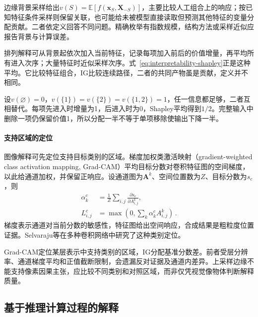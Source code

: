 边缘背景采样给出$v(S)=\mathbb E[f(\bm x_S,\bm X_{-S})]$，主要比较人工组合上的响应；按已知特征条件采样则保留关联，也可能给未被模型直接读取但预测其他特征的变量分配贡献。二者依定义回答不同问题。精确枚举有指数规模，结构方法或采样近似应报告背景与计算误差。

排列解释可从背景起依次加入当前特征，记录每项加入前后的价值增量，再平均所有进入次序；大量特征时近似采样次序。式~\eqref{eq:interpretability-shapley}正是这种平均。它比较特征组合，IG比较连续路径，二者的共同产物虽是贡献，定义并不相同。

\begin{example}[共同信息的贡献分配]
\label{ex:interpretability-redundancy}
设$v(\varnothing)=0$，$v(\{1\})=v(\{2\})=v(\{1,2\})=1$，任一信息都足够，二者互相替代。每项先进入时增量为1，后进入时为0，Shapley平均得到$1/2$。完整输入中删除一项仍保留价值1，所以分配一半不等于单项移除使输出下降一半。
\end{example}

\paragraph{支持区域的定位}

图像解释可先定位支持目标类别的区域。梯度加权类激活映射（gradient-weighted class activation mapping, Grad-CAM）平均目标分数对卷积特征图的空间梯度，以此给通道加权，并保留正响应。设通道图为$\bm A^k$、空间位置数为$Z$、目标分数为$s_c$，则
\begin{equation}
 \begin{aligned}
 \alpha_k^c&=\frac{1}{Z}\sum_{i,j}
 \frac{\partial s_c}{\partial A^k_{i,j}},\\
 L^c_{i,j}&=\max\!\left(0,\sum_k\alpha_k^c A^k_{i,j}\right)\, .
 \end{aligned}
 \label{eq:interpretability-gradcam}
\end{equation}
梯度表示通道对当前分数的敏感性，特征图给出空间响应，合成结果是粗粒度位置证据。Selvaraju等在多种卷积网络中研究了这种类别定位。

Grad-CAM定位某层表示中支持类别的区域，IG分配基准分数差。前者受层分辨率、通道梯度平均和正值截断限制，会遗漏反对证据及通道内差异。上采样边缘不能支持像素因果主张，应比较不同类别和对照区域，而非仅凭视觉像物体判断解释质量。

\subsection{基于推理计算过程的解释}
\label{sec:interpretability-local-mechanism}

